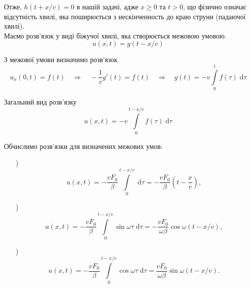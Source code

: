 Отже, $h(t + x/v) = 0$ в нашій задачі, адже $x \geq 0$ та $t > 0$, що фізично означає відсутність хвилі, яка поширюється з нескінченность до краю струни (падаючої хвилі).\\
Маємо розв'язок у виді біжучої хвилі, яка створюється межовою умовою.
\begin{equation}
    u(x,t) = g(t - x/v)
\end{equation}

З межової умови визначимо розв'язок
\begin{equation}
    u_x(0,t) = f(t)
    \quad\Rightarrow\quad
    -\frac{1}{v}g'(t) = f(t)
    \quad\Rightarrow\quad
    g(t) = - v \int\limits_0^t f(\tau) \;\mathrm{d}\tau
\end{equation}

Загальний вид розв'язку
\begin{equation}
    u(x,t) = - v \int\limits_0^{t-x/v} f(\tau) \;\mathrm{d}\tau
\end{equation}

Обчислимо розв'язки для визначених межових умов:
\begin{enumerate}
    \item[\text{а})] \[u(x,t) = - \frac{vF_0}{\beta} \int\limits_0^{t-x/v}  \;\mathrm{d}\tau = -\frac{vF_0}{\beta} \left(t - \frac{x}{v}\right),\]
    \item[\text{б})] \[u(x,t) = - \frac{vF_0}{\beta} \int\limits_0^{t-x/v} \sin\omega\tau \;\mathrm{d}\tau = -\frac{vF_0}{\omega\beta} \cos\omega(t - x/v),\]
    \item[\text{в})] \[u(x,t) = - \frac{vF_0}{\beta} \int\limits_0^{t-x/v} \cos\omega\tau \;\mathrm{d}\tau = \frac{vF_0}{\omega\beta} \sin\omega(t - x/v).\]
\end{enumerate} 

%